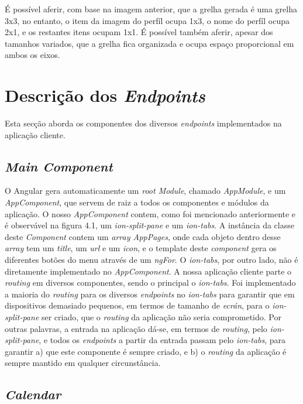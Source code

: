 É possível aferir, com base na imagem anterior, que a grelha gerada é uma grelha 3x3, no entanto, o item da imagem do perfíl ocupa 1x3, o nome do perfíl ocupa 2x1, e os restantes itens ocupam 1x1. É possível também aferir, apesar dos tamanhos variados, que a grelha fica organizada e ocupa espaço proporcional em ambos os eixos.
\newpage

\section{Descrição dos \textit{Endpoints}}\label{sec42}

Esta secção aborda os componentes dos diversos \textit{endpoints} implementados na aplicação cliente.


\subsection{\textit{Main Component}}\label{subsec421}

O Angular gera automaticamente um \textit{root Module}, chamado \textit{AppModule}, e um \textit{AppComponent}, que servem de raiz a todos os componentes e módulos da aplicação. O nosso \textit{AppComponent} contem, como foi mencionado anteriormente e é observável na figura 4.1, um \textit{ion-split-pane} e um \textit{ion-tabs}. A instância da classe deste \textit{Component} contem um \textit{array AppPages}, onde cada objeto dentro desse \textit{array} tem um \textit{title}, um \textit{url} e um \textit{icon}, e o template deste \textit{component} gera os diferentes botões do menu através de um \textit{ngFor}. 
O \textit{ion-tabs}, por outro lado, não é diretamente implementado no \textit{AppComponent}. A nossa aplicação cliente parte o \textit{routing} em diversos componentes, sendo o principal o \textit{ion-tabs}. Foi implementado a maioria do \textit{routing} para os diversos \textit{endpoints} no \textit{ion-tabs} para garantir que em dispositivos demasiado pequenos, em termos de tamanho de \textit{ecrán}, para o \textit{ion-split-pane} ser criado, que o \textit{routing} da aplicação não seria comprometido. Por outras palavras, a entrada na aplicação dá-se, em termos de \textit{routing}, pelo \textit{ion-split-pane}, e todos os \textit{endpoints} a partir da entrada passam pelo \textit{ion-tabs}, para garantir a) que este componente é sempre criado, e b) o \textit{routing} da aplicação é sempre mantido em qualquer circunstância.
\newpage

\subsection{\textit{Calendar}}\label{subsec422}

